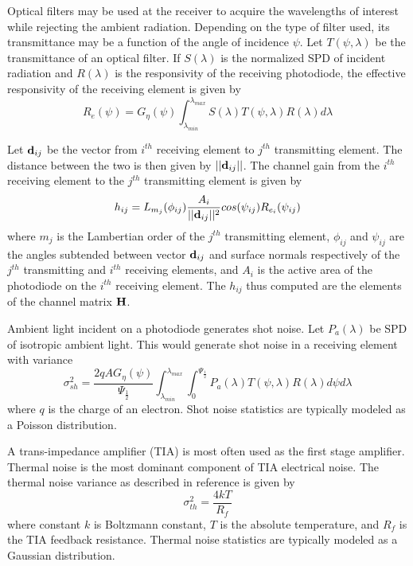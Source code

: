 Optical filters may be used at the receiver to acquire the wavelengths of interest while rejecting the ambient radiation. Depending on the type of filter used, its transmittance may be a function of the angle of incidence $\psi$. Let $T(\psi,\lambda)$ be the transmittance of an optical filter. If $S(\lambda)$ is the normalized SPD of incident radiation and $R(\lambda)$ is the responsivity of the receiving photodiode, the effective responsivity of the receiving element is given by
\begin{equation}
	\label{eqReff}
	R_e(\psi) = G_{\eta}(\psi)\int^{\lambda_{max}}_{\lambda_{min}}S(\lambda)T(\psi,\lambda)R(\lambda)d\lambda
\end{equation}

Let ${\bf{d}}_{ij}$ be the vector from $i^{th}$ receiving element to $j^{th}$ transmitting element. The distance between the two is then given by $||{\bf{d}}_{ij}||$. The channel gain from the $i^{th}$ receiving element to the $j^{th}$ transmitting element is given by
\begin{equation}
	\label{eqChGain}
	h_{ij} = L_{m_j}(\phi_{ij})\frac{A_i}{||{\bf{d}}_{ij}||^{2}}cos(\psi_{ij})R_{e_i}(\psi_{ij})
\end{equation}
where $m_j$ is the Lambertian order of the $j^{th}$ transmitting element, $\phi_{ij}$ and $\psi_{ij}$ are the angles subtended between vector ${\bf{d}}_{ij}$ and surface normals respectively of the $j^{th}$ transmitting and $i^{th}$ receiving elements, and $A_i$ is the active area of the photodiode on the $i^{th}$ receiving element. The $h_{ij}$ thus computed are the elements of the channel matrix ${\bf{H}}$.

Ambient light incident on a photodiode generates shot noise. Let $P_a(\lambda)$ be SPD of isotropic ambient light. This would generate shot noise in a receiving element with variance
\begin{equation}
	\label{eqNshot}
	\sigma_{sh}^{2} = \frac{2qAG_{\eta}(\psi)}{\Psi_{\frac{1}{2}}}\int_{\lambda_{min}}^{\lambda_{max}}\int_{0}^{\Psi_{\frac{1}{2}}}P_{a}(\lambda)T(\psi,\lambda)R(\lambda)d\psi d\lambda
\end{equation}
where $q$ is the charge of an electron. Shot noise statistics are typically modeled as a Poisson distribution.

A trans-impedance amplifier (TIA) is most often used as the first stage amplifier. Thermal noise is the most dominant component of TIA electrical noise. The thermal noise variance as described in reference \cite{kah97a} is given by 
\begin{equation}
	\label{eqNth}
	\sigma_{th}^{2} = \frac{4kT}{R_{f}}
\end{equation}
where constant $k$ is Boltzmann constant, $T$ is the absolute temperature, and $R_{f}$ is the TIA feedback resistance. Thermal noise statistics are typically modeled as a Gaussian distribution.

